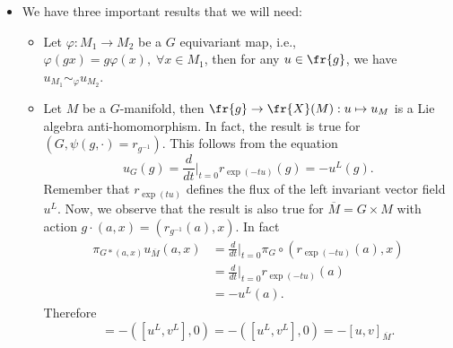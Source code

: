 \begin{itemize}
\begin{example}
\begin{equation}
\begin{split}
                &=\frac{d}{dt}\bigg|_{t=0}d_{\exp(tu)}r_{\exp(-tu)}(v^L(\exp(tu)))\\
                &=\frac{d}{dt}\bigg|_{t=0} r_{\exp(tu)*}(v^L)\big|_e\\
                &=\mathcal{L}_{u^L}(v^L)\big|_e\\
                &=[u^L,v^L]_e\\
                &=[u,v].
            \end{split}
        \end{equation}
        Therefore $\Ad_{*,e}=\ad$.
    \end{example}
    \item We have three important results that we will need: 
        \begin{itemize}
            \item[1.] Let $\varphi:M_1\to M_2$ be a $G$ equivariant map, i.e., $\varphi(gx)=g\varphi(x),\;\forall x\in M_1$, then 
            for any $u\in\fr{g}$, we have $u_{M_1}\sim_\varphi u_{M_2}$.
            \item[2.] Let $M$ be a $G$-manifold, then $\fr{g}\to\fr{X}(M):u\mapsto u_M$ is a Lie algebra anti-homomorphism. 
            In fact, the result is true for $(G,\psi(g,\cdot)=r_{g^{-1}})$. This follows from the equation 
            \begin{equation}
                u_G(g)=\frac{d}{dt}\bigg|_{t=0}r_{\exp(-tu)}(g)=-u^L(g).
            \end{equation}
            Remember that $r_{\exp(tu)}$ defines the flux of the left invariant vector field $u^L$. Now, we observe that 
            the result is also true for $\overline{M}=G\times M$ with action $g\cdot(a,x)=(r_{g^{-1}}(a),x)$. In fact 
            \begin{equation}
                \begin{split}
                    \pi_{G*(a,x)}u_{\overline{M}}(a,x)&=\frac{d}{dt}\bigg|_{t=0}\pi_G\circ(r_{\exp(-tu)}(a),x)\\
                    &=\frac{d}{dt}\bigg|_{t=0}r_{\exp(-tu)}(a)\\
                    &=-u^L(a).
                \end{split}
            \end{equation}
            Therefore
            \begin{equation}
                [u_{\overline{M}},v_{\overline{M}}]=
                -([u^L,v^L],0)=
                -([u^L,v^L],0)=
                -[u,v]_{\overline{M}}.
            \end{equation}

\end{itemize}
\end{itemize}

